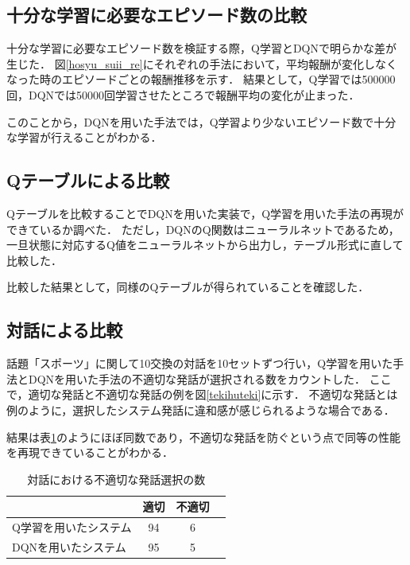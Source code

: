 \documentclass[a4j,dvipdfmx]{jarticle}
\begin{document}
\subsection{十分な学習に必要なエピソード数の比較}
十分な学習に必要なエピソード数を検証する際，Q学習とDQNで明らかな差が生じた．
図\ref{hosyu_suii_re}にそれぞれの手法において，平均報酬が変化しなくなった時のエピソードごとの報酬推移を示す．
結果として，Q学習では500000回，DQNでは50000回学習させたところで報酬平均の変化が止まった．

このことから，DQNを用いた手法では，Q学習より少ないエピソード数で十分な学習が行えることがわかる．

\subsection{Qテーブルによる比較}
Qテーブルを比較することでDQNを用いた実装で，Q学習を用いた手法の再現ができているか調べた．
ただし，DQNのQ関数はニューラルネットであるため，一旦状態に対応するQ値をニューラルネットから出力し，テーブル形式に直して比較した．

比較した結果として，同様のQテーブルが得られていることを確認した．
\subsection{対話による比較}
話題「スポーツ」に関して10交換の対話を10セットずつ行い，Q学習を用いた手法とDQNを用いた手法の不適切な発話が選択される数をカウントした．
ここで，適切な発話と不適切な発話の例を図\ref{tekihuteki}に示す．
不適切な発話とは例のように，選択したシステム発話に違和感が感じられるような場合である．


結果は表\ref{hikaku_taiwa}のようにほぼ同数であり，不適切な発話を防ぐという点で同等の性能を再現できていることがわかる．





\begin{table}[tb]
\caption{対話における不適切な発話選択の数}
\centering
  \begin{tabular}{|l|c|c|c|} \hline
      &適切& 不適切 \\ \hline \hline
    Q学習を用いたシステム & 94 & 6 \\ \hline
    DQNを用いたシステム & 95 & 5  \\ \hline
  \end{tabular}\label{hikaku_taiwa}
\end{table}
\end{document}
